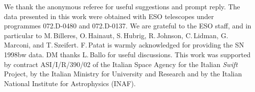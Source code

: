 \documentclass{emulateapj}
\begin{document}
\acknowledgments

We thank the anonymous referee for useful suggestions and prompt
reply. The data presented in this work were obtained with ESO telescopes
under programmes 072.D-0480 and 072.D-0137. We are grateful to the ESO
staff, and in particular to M.\,Billeres, O.\,Hainaut, S.\,Hubrig,
R.\,Johnson, C.\,Lidman, G.\,Marconi, and T.\,Szeifert.  F.\,Patat is
warmly acknowledged for providing the SN\,1998bw data. DM thanks
L.\,Ballo for useful discussions. This work was supported by contract
ASI/I/R/390/02 of the Italian Space Agency for the Italian {\it Swift}
Project, by the Italian Ministry for University and Research and by the
Italian National Institute for Astrophysics (INAF).


\begin{thebibliography}{}


\end{thebibliography}
\end{document}
